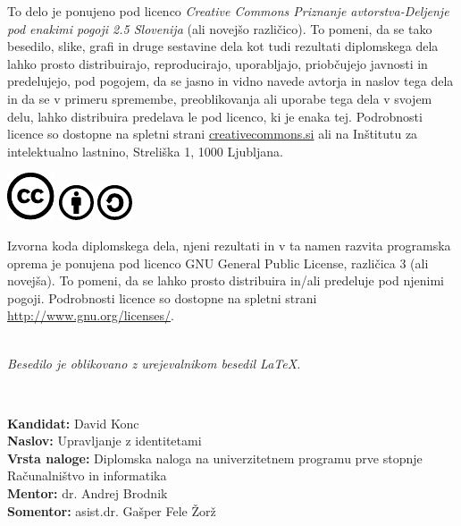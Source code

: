 \documentclass[a4paper,12pt,openright]{book}
\newcommand{\clearemptydoublepage}{\newpage{\pagestyle{empty}\cleardoublepage}}
\newcommand{\CcImageCc}[1]{%
	\includegraphics[scale=#1]{cc_cc_30.pdf}%
}
\newcommand{\CcImageBy}[1]{%
	\includegraphics[scale=#1]{cc_by_30.pdf}%
}
\newcommand{\CcImageSa}[1]{%
	\includegraphics[scale=#1]{cc_sa_30.pdf}%
}
\begin{document}
\newpage
\thispagestyle{empty}

\vspace*{5cm}
{\small \noindent
To delo je ponujeno pod licenco \textit{Creative Commons Priznanje avtorstva-Deljenje pod enakimi pogoji 2.5 Slovenija} (ali novej\v so razli\v cico).
To pomeni, da se tako besedilo, slike, grafi in druge sestavine dela kot tudi rezultati diplomskega dela lahko prosto distribuirajo,
reproducirajo, uporabljajo, priobčujejo javnosti in predelujejo, pod pogojem, da se jasno in vidno navede avtorja in naslov tega
dela in da se v primeru spremembe, preoblikovanja ali uporabe tega dela v svojem delu, lahko distribuira predelava le pod
licenco, ki je enaka tej.
Podrobnosti licence so dostopne na spletni strani \href{http://creativecommons.si}{creativecommons.si} ali na Inštitutu za
intelektualno lastnino, Streliška 1, 1000 Ljubljana.

\vspace*{1cm}
\begin{center}%
\CcImageCc{0.741573033707865}\hspace*{1ex}\CcImageBy{1}\hspace*{1ex}\CcImageSa{1}%
\end{center}
}

\vspace*{1cm}
{\small \noindent
Izvorna koda diplomskega dela, njeni rezultati in v ta namen razvita programska oprema je ponujena pod licenco GNU General Public License,
različica 3 (ali novejša). To pomeni, da se lahko prosto distribuira in/ali predeluje pod njenimi pogoji.
Podrobnosti licence so dostopne na spletni strani \url{http://www.gnu.org/licenses/}.
}

\vfill
\begin{center} 
\ \\ \vfill
{\em
Besedilo je oblikovano z urejevalnikom besedil \LaTeX.}
\end{center}

\clearemptydoublepage

\thispagestyle{empty}
\
\vfill

\bigskip
\noindent\textbf{Kandidat:} David Konc\\
\noindent\textbf{Naslov:} Upravljanje z identitetami\\
\noindent\textbf{Vrsta naloge:} Diplomska naloga na univerzitetnem programu prve stopnje Računalništvo in informatika \\
\noindent\textbf{Mentor:} dr. Andrej Brodnik\\
\noindent\textbf{Somentor:} asist.dr. Gašper Fele Žorž
\end{document}

